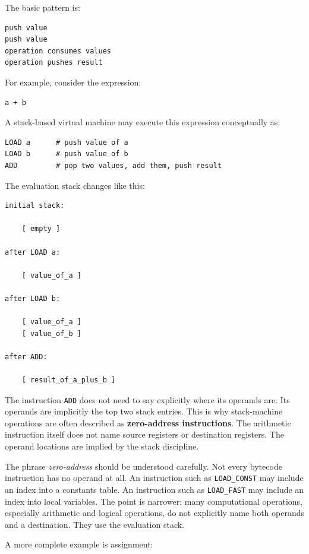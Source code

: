 The basic pattern is:

\begin{verbatim}
push value
push value
operation consumes values
operation pushes result
\end{verbatim}

For example, consider the expression:

\begin{verbatim}
a + b
\end{verbatim}

A stack-based virtual machine may execute this expression conceptually as:

\begin{verbatim}
LOAD a      # push value of a
LOAD b      # push value of b
ADD         # pop two values, add them, push result
\end{verbatim}

The evaluation stack changes like this:

\begin{verbatim}
initial stack:

    [ empty ]

after LOAD a:

    [ value_of_a ]

after LOAD b:

    [ value_of_a ]
    [ value_of_b ]

after ADD:

    [ result_of_a_plus_b ]
\end{verbatim}

The instruction \texttt{ADD} does not need to say explicitly where its operands are. Its operands are implicitly the top two stack entries. This is why stack-machine operations are often described as \textbf{zero-address instructions}. The arithmetic instruction itself does not name source registers or destination registers. The operand locations are implied by the stack discipline.

The phrase \emph{zero-address} should be understood carefully. Not every bytecode instruction has no operand at all. An instruction such as \texttt{LOAD\_CONST} may include an index into a constants table. An instruction such as \texttt{LOAD\_FAST} may include an index into local variables. The point is narrower: many computational operations, especially arithmetic and logical operations, do not explicitly name both operands and a destination. They use the evaluation stack.

A more complete example is assignment:


